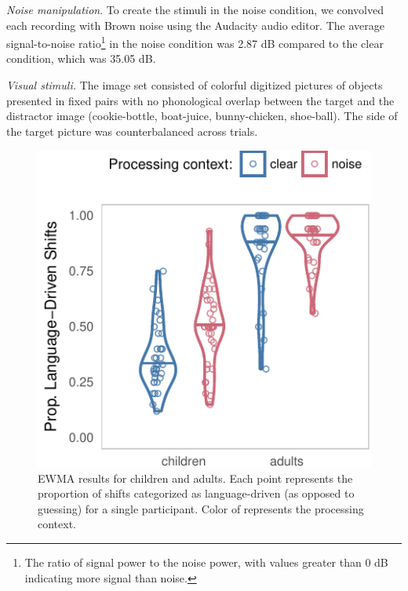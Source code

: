 \documentclass[10pt, letterpaper]{article}
\newenvironment{CodeChunk}{}{}
\begin{document}
\emph{Noise manipulation}. To create the stimuli in the noise condition,
we convolved each recording with Brown noise using the Audacity audio
editor. The average signal-to-noise ratio\footnote{The ratio of signal
  power to the noise power, with values greater than 0 dB indicating
  more signal than noise.} in the noise condition was 2.87 dB compared
to the clear condition, which was 35.05 dB.

\emph{Visual stimuli.} The image set consisted of colorful digitized
pictures of objects presented in fixed pairs with no phonological
overlap between the target and the distractor image (cookie-bottle,
boat-juice, bunny-chicken, shoe-ball). The side of the target picture
was counterbalanced across trials.

\begin{CodeChunk}
\begin{figure}[t]

{\centering \includegraphics[width=0.8\linewidth]{figs/ewma_violin_plot-1} 

}

\caption[EWMA results for children and adults]{EWMA results for children and adults. Each point represents the proportion of shifts categorized as language-driven (as opposed to guessing) for a single participant. Color of represents the processing context.}\label{fig:ewma_violin_plot}
\end{figure}
\end{CodeChunk}
\end{document}
